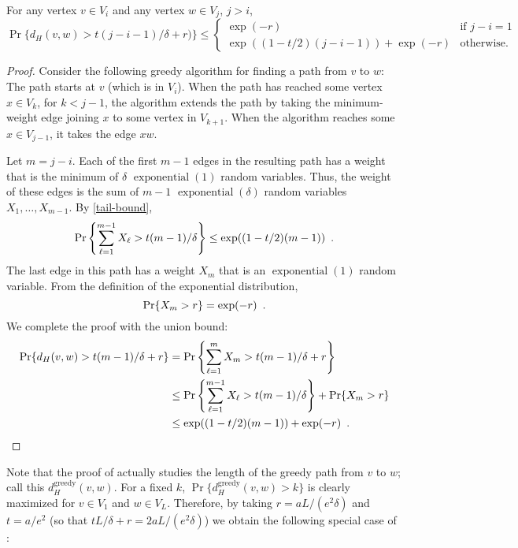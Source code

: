 \documentclass[lotsofwhite]{patmorin}
\DeclareMathOperator{\exponential}{exponential}
\begin{document}
\begin{lem}
   For any vertex $v\in V_i$ and any vertex $w\in V_j$, $j>i$,
   \[
       \Pr\{d_H(v,w) > t(j-i-1)/\delta + r) \} \le
       \begin{cases}
           \exp(-r) & \text{if $j-i=1$} \\
           \exp((1-t/2)(j-i-1)) + \exp(-r) & \text{otherwise.}
       \end{cases}
   \]
\end{lem}

\begin{proof}
   Consider the following greedy algorithm for finding a path from $v$
   to $w$: The path starts at $v$ (which is in $V_i$).  When the path
   has reached some vertex $x\in V_{k}$, for $k<j-1$, the algorithm
   extends the path by taking the minimum-weight edge joining $x$ to some
   vertex in $V_{k+1}$.  When the algorithm reaches some $x\in V_{j-1}$,
   it takes the edge $xw$.

   Let $m=j-i$.  Each of the first $m-1$ edges in the resulting path
   has a weight that is the minimum of $\delta$ $\exponential(1)$
   random variables.  Thus, the weight of these edges is the sum of
   $m-1$ $\exponential(\delta)$ random variables $X_1,\ldots,X_{m-1}$.
   By \eqref{tail-bound},
   \begin{equation}
     \Pr\left\{\sum_{\ell=1}^{m-1} X_\ell > t(m-1)/\delta \right\} \le 
        \exp((1-t/2)(m-1)) \enspace .  \eqlabel{part-i}
   \end{equation}
   The last edge in this path has a weight $X_m$ that is an
   $\exponential(1)$ random variable.  From the definition
   of the exponential distribution,
   \begin{equation}
      \Pr\{X_m > r\} = \exp(-r) \enspace . \eqlabel{part-ii}
   \end{equation}
   We complete the proof with the union bound:
   \begin{align*}
      \Pr\{d_H(v,w) > t(m-1)/\delta + r\} &
        = \Pr\left\{\sum_{\ell=1}^m X_m > t(m-1)/\delta + r\right\} \\
        & \le \Pr\left\{\sum_{\ell=1}^{m-1} X_\ell > t(m-1)/\delta\right\}
          + \Pr\{X_m>r\} \\
        & \le \exp((1-t/2)(m-1)) + \exp(-r) \enspace . \qedhere
   \end{align*}
\end{proof}

Note that the proof of  actually studies the length of
the greedy path from $v$ to $w$; call this $d_H^{\mathrm{greedy}}(v,w)$.
For a fixed $k$, $\Pr\{d_H^{\mathrm{greedy}}(v,w) > k\}$ is clearly
maximized for $v\in V_1$ and $w\in V_L$. Therefore, by taking
$r=aL/(e^2\delta)$ and $t=a/e^2$ (so that $tL/\delta+r = 2aL/(e^2\delta)$)
we obtain the following special case of :
\end{document}
